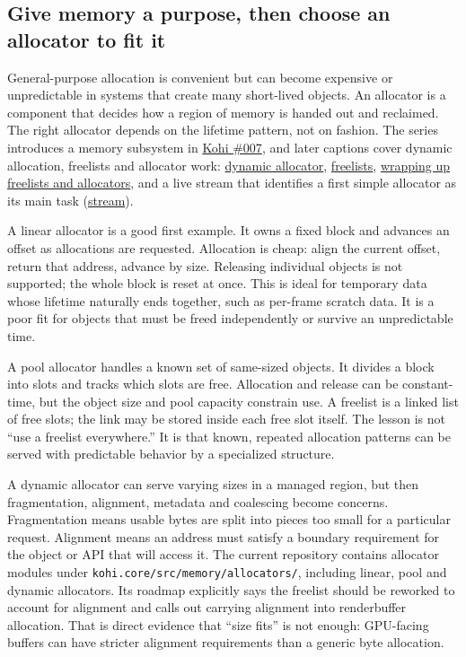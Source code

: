 \subsection{Give memory a purpose, then choose an allocator to fit it}\label{05-engine-i-ch014-give-memory-a-purpose-then-choose-an-allocator-to-fit-it}

\hypertarget{05-engine-i-ch014-give-memory-a-purpose-then-choose-an-allocator-to-fit-it}{}

General-purpose allocation is convenient but can become expensive or unpredictable in systems that create many short-lived objects. An allocator is a component that decides how a region of memory is handed out and reclaimed. The right allocator depends on the lifetime pattern, not on fashion. The series introduces a memory subsystem in \href{https://www.youtube.com/watch?v=_GBUCo2FbUk}{Kohi \#007}, and later captions cover dynamic allocation, freelists and allocator work: \href{https://www.youtube.com/watch?v=BSBFBWwG8Ds}{dynamic allocator}, \href{https://www.youtube.com/watch?v=sP7xRUyP3e0}{freelists}, \href{https://www.youtube.com/watch?v=SNDJ-rGJd5A}{wrapping up freelists and allocators}, and a live stream that identifies a first simple allocator as its main task (\href{https://www.youtube.com/watch?v=3ZFcvBjRFN0}{stream}).

A linear allocator is a good first example. It owns a fixed block and advances an offset as allocations are requested. Allocation is cheap: align the current offset, return that address, advance by size. Releasing individual objects is not supported; the whole block is reset at once. This is ideal for temporary data whose lifetime naturally ends together, such as per-frame scratch data. It is a poor fit for objects that must be freed independently or survive an unpredictable time.

A pool allocator handles a known set of same-sized objects. It divides a block into slots and tracks which slots are free. Allocation and release can be constant-time, but the object size and pool capacity constrain use. A freelist is a linked list of free slots; the link may be stored inside each free slot itself. The lesson is not ``use a freelist everywhere.'' It is that known, repeated allocation patterns can be served with predictable behavior by a specialized structure.

A dynamic allocator can serve varying sizes in a managed region, but then fragmentation, alignment, metadata and coalescing become concerns. Fragmentation means usable bytes are split into pieces too small for a particular request. Alignment means an address must satisfy a boundary requirement for the object or API that will access it. The current repository contains allocator modules under \texttt{kohi.core/src/memory/allocators/}, including linear, pool and dynamic allocators. Its roadmap explicitly says the freelist should be reworked to account for alignment and calls out carrying alignment into renderbuffer allocation. That is direct evidence that ``size fits'' is not enough: GPU-facing buffers can have stricter alignment requirements than a generic byte allocation.

